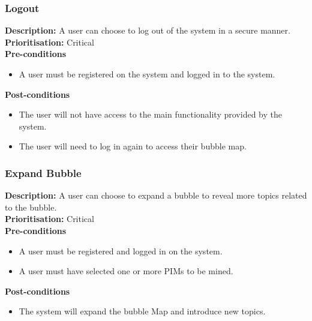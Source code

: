 \documentclass[hidelinks,english]{article}
\begin{document}
    		\subsubsection{Logout}
				\textbf{Description:}  A user can choose to log out of the system in a secure manner.\\
    			\textbf{Prioritisation:} Critical\\
      			\textbf{Pre-conditions}
    			\begin{itemize}
        			\item A user must be registered on the system and logged in to the system.
    			\end{itemize}
    			\textbf{Post-conditions}
     			\begin{itemize}
        			\item The user will not have access to the main functionality provided by the system.
        			\item The user will need to log in again to access their bubble map.
    			\end{itemize}
    			
    		\subsubsection{Expand Bubble}
				\textbf{Description:}  A user can choose to expand a bubble to reveal more topics related to the bubble.\\
			    \textbf{Prioritisation:} Critical\\
      			\textbf{Pre-conditions}
			    \begin{itemize}
			        \item A user must be registered and logged in on the system.
			        \item A user must have selected one or more PIMs to be mined.
			    \end{itemize}
			    \textbf{Post-conditions}
			     \begin{itemize}
			        \item The system will expand the bubble Map and introduce new topics.
			    \end{itemize}
			    
\end{document}
